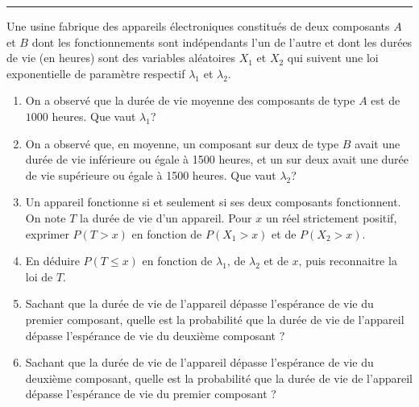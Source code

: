 \documentclass[../PolyS4.tex]{subfiles}
\begin{document}
\vspace{1em}
\hrule
\vspace{1em}


Une usine fabrique des appareils électroniques constitués de deux composants $A$ et $B$ dont les fonctionnements sont indépendants l'un de l'autre et dont les durées 
de vie (en heures) sont des variables aléatoires $X_1$ et $X_2$ qui suivent une loi exponentielle de paramètre respectif $\lambda_1$ et $\lambda_2$.
\begin{enumerate}
\item On a observé que la durée de vie moyenne des composants de type $A$ est de $1000$ heures. Que vaut $\lambda_1$?
\item On a observé que, en moyenne, un composant sur deux de type $B$  avait une durée de vie inférieure ou égale à 1500 heures, et un sur deux avait une durée de vie supérieure ou égale à 1500 heures. Que vaut $\lambda_2$?
\item Un appareil fonctionne si et seulement si ses deux composants fonctionnent. On note $T$ la durée de vie d'un appareil. Pour $x$ un réel strictement positif, exprimer $P(T> x)$ en fonction de $P(X_1> x)$ et de $P(X_2> x)$.
\item En déduire $P(T\leq x)$ en fonction de $\lambda_1$, de $\lambda_2$ et de $x$, puis reconnaitre la loi de $T$.
\item Sachant que la durée de vie de l'appareil dépasse l'espérance de vie du premier composant, quelle est la probabilité que la durée de vie de l'appareil dépasse l'espérance de vie du deuxième composant ?
\item Sachant que la durée de vie de l'appareil dépasse l'espérance de vie du deuxième composant, quelle est la probabilité que la durée de vie de l'appareil dépasse l'espérance de vie du premier composant ?\\
\end{enumerate}



\newpage 


\end{document}
